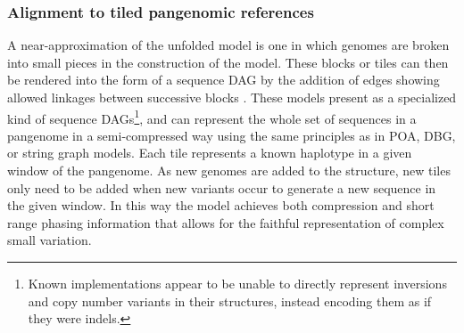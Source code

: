

\subsubsection{Alignment to tiled pangenomic references}

A near-approximation of the unfolded model is one in which genomes are broken into small pieces in the construction of the model.
These blocks or tiles can then be rendered into the form of a sequence DAG by the addition of edges showing allowed linkages between successive blocks \cite{guthrie2015tiling}.
These models present as a specialized kind of sequence DAGs\footnote{Known implementations appear to be unable to directly represent inversions and copy number variants in their structures, instead encoding them as if they were indels.}, and can represent the whole set of sequences in a pangenome in a semi-compressed way using the same principles as in POA, DBG, or string graph models.
Each tile represents a known haplotype in a given window of the pangenome.
As new genomes are added to the structure, new tiles only need to be added when new variants occur to generate a new sequence in the given window.
In this way the model achieves both compression and short range phasing information that allows for the faithful representation of complex small variation.

